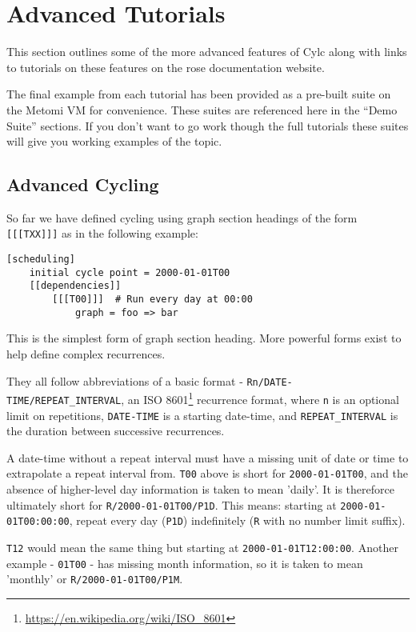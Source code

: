 \section{Advanced Tutorials}

This section outlines some of the more advanced features of Cylc along with
links to tutorials on these features on the rose documentation website.

The final example from each tutorial has been provided as a pre-built suite on
the Metomi VM for convenience. These suites are referenced here in the ``Demo
Suite'' sections. If you don't want to go work though the full tutorials these
suites will give you working examples of the topic.


\subsection{Advanced Cycling}
\label{advanced-cycling}

So far we have defined cycling using graph section headings of the form
\lstinline{[[[TXX]]]} as in the following example:

\begin{lstlisting}
[scheduling]
    initial cycle point = 2000-01-01T00
    [[dependencies]]
        [[[T00]]]  # Run every day at 00:00
            graph = foo => bar
\end{lstlisting}

This is the simplest form of graph section heading. More powerful forms exist
to help define complex recurrences.

They all follow abbreviations of a basic format - \lstinline{Rn/DATE-TIME/REPEAT_INTERVAL}, an ISO 8601\footnote{\url{https://en.wikipedia.org/wiki/ISO_8601}} recurrence format, where \lstinline{n} is an optional limit on repetitions, \lstinline{DATE-TIME} is a starting date-time, and \lstinline{REPEAT_INTERVAL} is the duration between successive recurrences.

A date-time without a repeat interval must have a missing unit of date or time to extrapolate a repeat interval from. \lstinline{T00} above is short for \lstinline{2000-01-01T00}, and the absence of higher-level day information is taken to mean 'daily'. It is thereforce ultimately short for \lstinline{R/2000-01-01T00/P1D}. This means: starting at \lstinline{2000-01-01T00:00:00}, repeat every day (\lstinline{P1D}) indefinitely (\lstinline{R} with no number limit suffix).

\lstinline{T12} would mean the same thing but starting at \lstinline{2000-01-01T12:00:00}. Another example - \lstinline{01T00} - has missing month information, so it is taken to mean 'monthly' or \lstinline{R/2000-01-01T00/P1M}.

